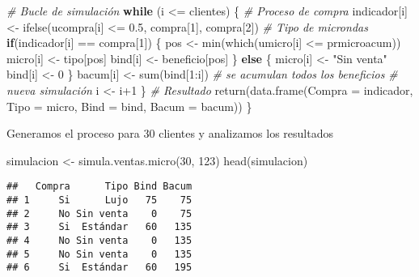 \documentclass[
]{book}
\newenvironment{Shaded}{\begin{snugshade}}{\end{snugshade}}
\newcommand{\AttributeTok}[1]{\textcolor[rgb]{0.77,0.63,0.00}{#1}}
\newcommand{\CommentTok}[1]{\textcolor[rgb]{0.56,0.35,0.01}{\textit{#1}}}
\newcommand{\ControlFlowTok}[1]{\textcolor[rgb]{0.13,0.29,0.53}{\textbf{#1}}}
\newcommand{\DecValTok}[1]{\textcolor[rgb]{0.00,0.00,0.81}{#1}}
\newcommand{\FloatTok}[1]{\textcolor[rgb]{0.00,0.00,0.81}{#1}}
\newcommand{\FunctionTok}[1]{\textcolor[rgb]{0.00,0.00,0.00}{#1}}
\newcommand{\NormalTok}[1]{#1}
\newcommand{\OtherTok}[1]{\textcolor[rgb]{0.56,0.35,0.01}{#1}}
\newcommand{\SpecialCharTok}[1]{\textcolor[rgb]{0.00,0.00,0.00}{#1}}
\newcommand{\StringTok}[1]{\textcolor[rgb]{0.31,0.60,0.02}{#1}}
\theoremstyle{definition}
\theoremstyle{definition}
\theoremstyle{definition}
\theoremstyle{definition}
\theoremstyle{remark}
\begin{document}
\begin{Shaded}
\begin{Highlighting}[]
\CommentTok{\# Bucle de simulación}
\ControlFlowTok{while}\NormalTok{ (i }\SpecialCharTok{\textless{}=}\NormalTok{ clientes)}
\NormalTok{\{}
  \CommentTok{\# Proceso de compra}
\NormalTok{  indicador[i] }\OtherTok{\textless{}{-}} \FunctionTok{ifelse}\NormalTok{(ucompra[i] }\SpecialCharTok{\textless{}=} \FloatTok{0.5}\NormalTok{, compra[}\DecValTok{1}\NormalTok{], compra[}\DecValTok{2}\NormalTok{])}
  \CommentTok{\# Tipo de microndas}
  \ControlFlowTok{if}\NormalTok{(indicador[i] }\SpecialCharTok{==}\NormalTok{ compra[}\DecValTok{1}\NormalTok{])}
\NormalTok{  \{}
\NormalTok{    pos }\OtherTok{\textless{}{-}} \FunctionTok{min}\NormalTok{(}\FunctionTok{which}\NormalTok{(umicro[i] }\SpecialCharTok{\textless{}=}\NormalTok{ prmicroacum))}
\NormalTok{    micro[i] }\OtherTok{\textless{}{-}}\NormalTok{ tipo[pos]}
\NormalTok{    bind[i] }\OtherTok{\textless{}{-}}\NormalTok{ beneficio[pos]}
\NormalTok{  \}}
  \ControlFlowTok{else}
\NormalTok{  \{}
\NormalTok{    micro[i] }\OtherTok{\textless{}{-}} \StringTok{"Sin venta"}
\NormalTok{    bind[i] }\OtherTok{\textless{}{-}} \DecValTok{0}
\NormalTok{  \}}
\NormalTok{  bacum[i] }\OtherTok{\textless{}{-}} \FunctionTok{sum}\NormalTok{(bind[}\DecValTok{1}\SpecialCharTok{:}\NormalTok{i])  }\CommentTok{\# se acumulan todos los beneficios}
  \CommentTok{\# nueva simulación}
\NormalTok{  i }\OtherTok{\textless{}{-}}\NormalTok{ i}\SpecialCharTok{+}\DecValTok{1}
\NormalTok{\}}
\CommentTok{\# Resultado}
\FunctionTok{return}\NormalTok{(}\FunctionTok{data.frame}\NormalTok{(}\AttributeTok{Compra =}\NormalTok{ indicador, }\AttributeTok{Tipo =}\NormalTok{ micro, }
                  \AttributeTok{Bind =}\NormalTok{ bind, }\AttributeTok{Bacum =}\NormalTok{ bacum))}
\NormalTok{\}}
\end{Highlighting}
\end{Shaded}

Generamos el proceso para 30 clientes y analizamos los resultados

\begin{Shaded}
\begin{Highlighting}[]
\NormalTok{simulacion }\OtherTok{\textless{}{-}} \FunctionTok{simula.ventas.micro}\NormalTok{(}\DecValTok{30}\NormalTok{, }\DecValTok{123}\NormalTok{)}
\FunctionTok{head}\NormalTok{(simulacion)}
\end{Highlighting}
\end{Shaded}

\begin{verbatim}
##   Compra      Tipo Bind Bacum
## 1     Si      Lujo   75    75
## 2     No Sin venta    0    75
## 3     Si  Estándar   60   135
## 4     No Sin venta    0   135
## 5     No Sin venta    0   135
## 6     Si  Estándar   60   195
\end{verbatim}
\end{document}
